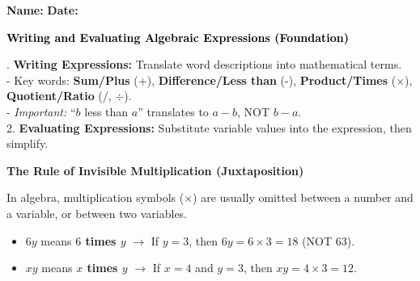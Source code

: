 \documentclass[12pt, letterpaper, fleqn]{article}
\begin{document}
\textbf{Name:} \underline{\hspace{5cm}}
\hfill
\textbf{Date:} \underline{\hspace{3cm}}\\

\begin{tcolorbox}[colback=black!10]
    \large\textcolor{black}{\textbf{Writing and Evaluating Algebraic Expressions (Foundation)}}
\end{tcolorbox}

\vspace{3mm}

. \textbf{Writing Expressions:} Translate word descriptions into mathematical terms. \\
- Key words: \textbf{Sum/Plus} (+), \textbf{Difference/Less than} (-), \textbf{Product/Times} ($\times$), \textbf{Quotient/Ratio} ($/$, $\div$). \\
- \textit{Important:} ``$b$ less than $a$'' translates to $a - b$, NOT $b - a$. \\
2. \textbf{Evaluating Expressions:} Substitute variable values into the expression, then simplify.

\vspace{4mm}

\small
\begin{tcolorbox}[colback=blue!5, colframe=blue!60!black, boxrule=0.8pt]
\textbf{The Rule of Invisible Multiplication (Juxtaposition)}

\medskip
In algebra, multiplication symbols ($\times$) are usually omitted between a number and a variable, or between two variables. 
\begin{itemize}[itemsep=4pt]
    \item $6y$ means \textbf{$6$ times $y$} \quad $\rightarrow$ \quad If $y = 3$, then $6y = 6 \times 3 = 18$ (NOT $63$).
    \item $xy$ means \textbf{$x$ times $y$} \quad $\rightarrow$ \quad If $x = 4$ and $y = 3$, then $xy = 4 \times 3 = 12$.
\end{itemize}
\end{tcolorbox}
\end{document}
